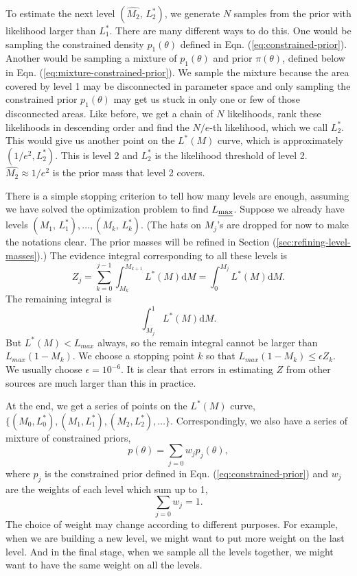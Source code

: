 \documentclass[letterpaper, preprint]{aastex}
\begin{document}
To estimate the next level $\left(\widehat{M_2}, \,L^*_2\right)$, we generate $N$ samples from the prior with likelihood larger than $L^*_1$. There are many different ways to do this. One would be sampling the constrained density $p_{1}(\theta)$ defined in Eqn. (\ref{eq:constrained-prior}). Another would be sampling a mixture of $p_{1}(\theta)$ and prior $\pi(\theta)$, defined below in Eqn. (\ref{eq:mixture-constrained-prior}). We sample the mixture because the area covered by level 1 may be disconnected in parameter space and only sampling the constrained prior $p_{1}(\theta)$ may get us stuck in only one or few of those disconnected areas. Like before, we get a chain of $N$ likelihoods, rank these likelihoods in descending order and find the $N/e$-th likelihood, which we call $L_2^*$. This would give us another point on the $L^*(M)$ curve, which is approximately $(1/e^2,L_2^*)$. This is level 2 and $L_2^*$ is the likelihood threshold of level 2. $\widehat{M_2}\approx1/e^2$ is the prior mass that level 2 covers. 

There is a simple stopping criterion to tell how many levels are enough, assuming we have solved the optimization problem to find $L_{\mbox{\scriptsize \em max}}$. Suppose we already have levels $\left(M_1,\,L^*_1\right), \ldots, \left(M_k,\,L^*_k\right)$. (The hats on $M_j$'s are dropped for now to make the notations clear. The prior masses will be refined in Section (\ref{sec:refining-level-masses}).) The evidence integral corresponding to all these levels is 
$$
Z_j= \sum_{k=0}^{j-1} \int_{M_k}^{M_{k+1}} L^*(M)\mathrm{d}M 
= \int_0^{M_{j}} L^*(M)\mathrm{d}M .
$$
The remaining integral is
$$
\int_{M_j}^1 L^*(M) \mathrm{d}M.
$$
But $L^*(M) < L_{max}$ always, so the remain integral cannot be larger than $L_{max}(1-M_k)$. We choose a stopping point $k$ so that $L_{max}(1-M_k) \leq \epsilon Z_k$. We usually choose $\epsilon = 10^{-6}$. It is clear that errors in estimating $Z$ from other sources are much larger than this in practice.

At the end, we get a series of points on the $L^*(M)$ curve, $\{(M_0, L_0^*),(M_1,L_1^*),(M_2,L_2^*), \ldots\}$. Correspondingly, we also have a series of mixture of constrained priors,
\begin{equation}
p(\theta) = \sum_{j=0} w_j p_{j}(\theta),
\label{eq:mixture-constrained-prior}
\end{equation}
where $p_{j}$ is the constrained prior defined in Eqn. (\ref{eq:constrained-prior})
and $w_j$ are the weights of each level which sum up to 1,
\begin{equation}
\sum_{j=0}w_j = 1.
\end{equation}
The choice of weight may change according to different purposes. For example, when we are building a new level, we might want to put more weight on the last level. And in the final stage, when we sample all the levels together, we might want to have the same weight on all the levels.
\end{document}
